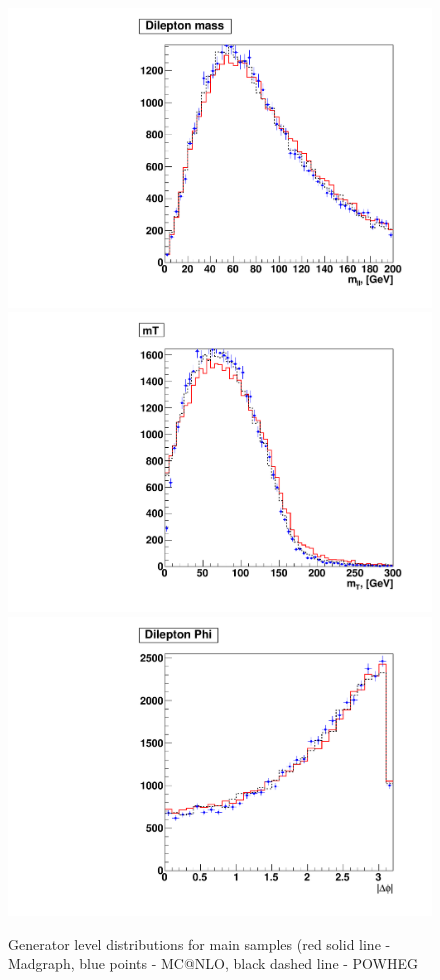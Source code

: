 \begin{figure}[!hbtp]
\centering
\includegraphics[width=.45\textwidth]{figures/wwshape_ref_mll}
\includegraphics[width=.45\textwidth]{figures/wwshape_ref_mt}
\includegraphics[width=.45\textwidth]{figures/wwshape_ref_dphi}
\caption{Generator level distributions for main samples (red solid line - Madgraph, blue points - MC@NLO, black dashed line - POWHEG}
\label{fig:appendix_wwshape_ref}
\end{figure}

